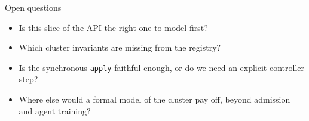 \documentclass[10pt,aspectratio=169]{beamer}
\begin{document}
\begin{frame}{Open questions}
\begin{itemize}\itemsep0.45em
  \item Is this slice of the API the right one to model first?
  \item Which cluster invariants are missing from the registry?
  \item Is the synchronous \texttt{apply} faithful enough, or do we need an explicit controller step?
  \item Where else would a formal model of the cluster pay off, beyond admission and agent training?
\end{itemize}
\end{frame}
\end{document}
